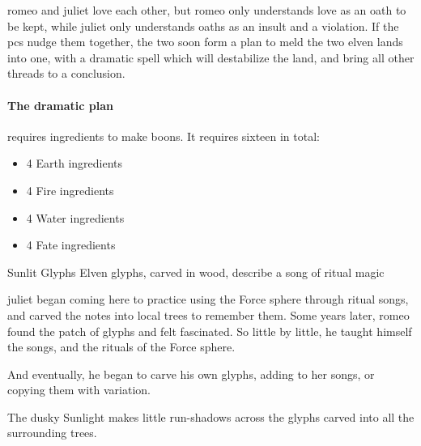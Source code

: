 
\Gls{romeo} and \gls{juliet} love each other, but \gls{romeo} only understands love as an oath to be kept, while \gls{juliet} only understands oaths as an insult and a violation.
If the \glspl{pc} nudge them together, the two soon form a plan to meld the two elven lands into one, with a dramatic \gls{spell} which will destabilize the land, and bring all other threads to a conclusion.

\paragraph{The dramatic plan}
requires \glspl{ingredient} to make \glspl{boon}.
It requires sixteen in total:

\begin{itemize}
  \item
  4 Earth \glspl{ingredient}
  \item
  4 Fire \glspl{ingredient}
  \item
  4 Water \glspl{ingredient}
  \item
  4 Fate \glspl{ingredient}
\end{itemize}

{Sunlit Glyphs}%
{Elven glyphs, carved in wood, describe a song of ritual magic}%

\begin{exampletext}
  \Gls{juliet} began coming here to practice using the Force \gls{sphere} through ritual songs, and carved the notes into local trees to remember them.
  Some years later, \gls{romeo} found the patch of glyphs and felt fascinated.
  So little by little, he taught himself the songs, and the rituals of the Force \gls{sphere}.

  And eventually, he began to carve his own glyphs, adding to her songs, or copying them with variation.
\end{exampletext}



\begin{boxtext}
  The dusky Sunlight makes little run-shadows across the glyphs carved into all the surrounding trees.
\end{boxtext}

